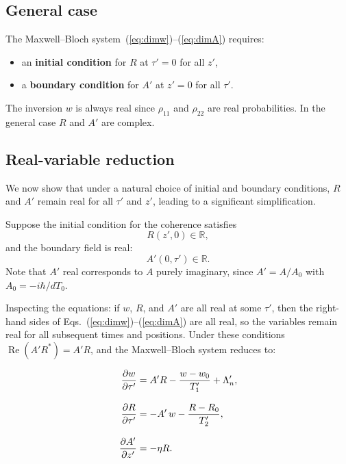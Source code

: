 \documentclass[12pt,a4paper]{article}
\newcommand{\T}{T_0}
\begin{document}
\subsection{General case}

The Maxwell--Bloch system~(\ref{eq:dimw})--(\ref{eq:dimA}) requires:
\begin{itemize}
  \item an \textbf{initial condition} for $R$ at $\tau' = 0$ for all $z'$,
  \item a \textbf{boundary condition} for $A'$ at $z' = 0$ for all $\tau'$.
\end{itemize}
The inversion $w$ is always real since $\rho_{11}$ and $\rho_{22}$ are real
probabilities. In the general case $R$ and $A'$ are complex.

\subsection{Real-variable reduction}\label{subsec:real}

We now show that under a natural choice of initial and boundary conditions,
$R$ and $A'$ remain real for all $\tau'$ and $z'$, leading to a significant
simplification.

Suppose the initial condition for the coherence satisfies
\begin{equation}
  R(z', 0) \in \mathbb{R},
\end{equation}
and the boundary field is real:
\begin{equation}
  A'(0, \tau') \in \mathbb{R}.
\end{equation}
Note that $A'$ real corresponds to $A$ purely imaginary, since
$A'=A/A_0$ with $A_0= -i\hbar/d\T$.

Inspecting the equations: if $w$, $R$, and $A'$ are all real at some
$\tau'$, then the right-hand sides of
Eqs.~(\ref{eq:dimw})--(\ref{eq:dimA}) are all real, so the variables
remain real for all subsequent times and positions. Under these conditions
$\operatorname{Re}(A'R^*) = A'R$, and the Maxwell--Bloch system reduces to:

\begin{resultbox}
\begin{align}
  \dfrac{\partial w}{\partial \tau'}
    &= A'R - \frac{w - w_0}{T_1'} + \Lambda_n',
  \label{eq:realw}\\[8pt]
  \dfrac{\partial R}{\partial \tau'}
    &= -A'\,w - \frac{R-R_0}{T_2'},
  \label{eq:realR}\\[8pt]
  \dfrac{\partial A'}{\partial z'}
    &= -\eta R.
  \label{eq:realA}
\end{align}
\end{resultbox}
\end{document}
